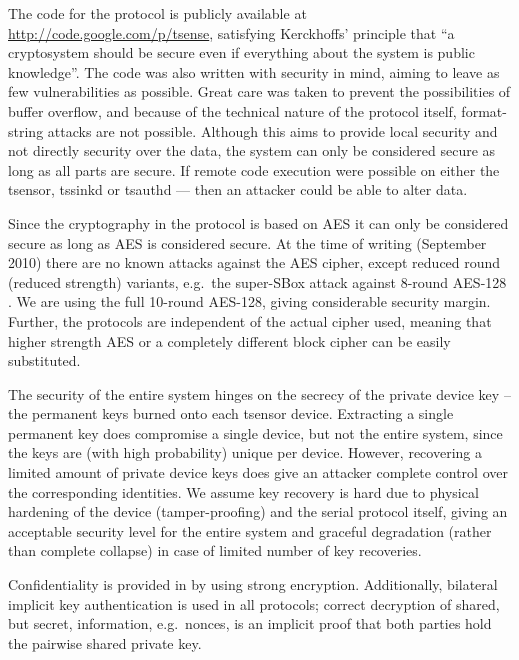 The code for the protocol is publicly available at \url{http://code.google.com/p/tsense}, satisfying Kerckhoffs' principle that ``a cryptosystem should be secure even if everything about the system is public knowledge''. The code was also written with security in mind, aiming to leave as few vulnerabilities as possible. Great care was taken to prevent the possibilities of buffer overflow, and because of the technical nature of the protocol itself, format-string attacks are not possible. Although this aims to provide local security and not directly security over the data, the system can only be considered secure as long as all parts are secure. If remote code execution were possible on either the tsensor, tssinkd or tsauthd --- then an attacker could be able to alter data. 

Since the cryptography in the protocol is based on AES it can only be considered secure as long as AES is considered secure. At the time of writing (September 2010) there are no known attacks against the AES cipher, except reduced round (reduced strength) variants, e.g.\ the super-SBox attack against 8-round AES-128 . We are using the full 10-round AES-128, giving considerable security margin. 
Further, the protocols are independent of the actual cipher used, meaning that higher strength AES or a completely different block cipher can be easily substituted.

The security of the entire system hinges on the secrecy of the private device key -- the permanent keys burned onto each tsensor device. Extracting a single permanent key does compromise a single device, but not the entire system, since the keys are (with high probability) unique per device. However, recovering a limited amount of private device keys does give an attacker complete control over the corresponding identities. We assume key recovery is hard due to physical hardening of the device (tamper-proofing) and the serial protocol itself, giving an acceptable security level for the entire system and graceful degradation (rather than complete collapse) in case of limited number of key recoveries.

Confidentiality is provided in by using strong encryption. Additionally, bilateral implicit key authentication  is used in all protocols; correct decryption of shared, but secret, information, e.g.\ nonces, is an implicit proof that both parties hold the pairwise shared private key.

